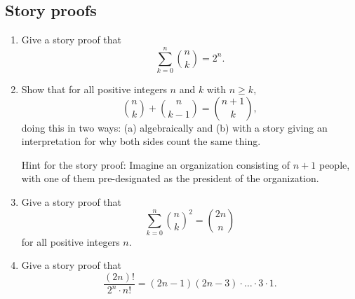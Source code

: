\documentclass{article}
\begin{document}
\subsection{Story proofs}
\begin{enumerate}
	\item Give a story proof that
	$$
	\sum_{k = 0}^n \binom{n}{k} = 2^n.
	$$
	\item Show that for all positive integers $n$ and $k$ with $n \geq k$,
	$$
	\binom{n}{k} + \binom{n}{k - 1} = \binom{n + 1}{k},
	$$
	doing this in two ways: (a) algebraically and (b) with a story giving an interpretation for why both sides count the same thing.

	Hint for the story proof: Imagine an organization consisting of $n + 1$ people, with one of them pre-designated as the president of the organization.
	\item Give a story proof that
	$$
	\sum_{k = 0}^n \binom{n}{k}^2 = \binom{2n}{n}
	$$
	for all positive integers $n$.
	\item Give a story proof that
	$$
	\frac{(2n)!}{2^n \cdot n!} = (2n - 1) (2n - 3) \cdot \dots \cdot 3 \cdot 1.
	$$
\end{enumerate}
\end{document}
